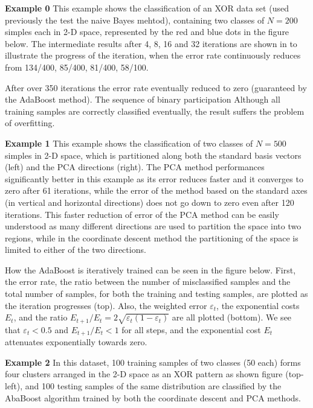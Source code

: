 \documentclass{article}
\begin{document}
{\bf Example 0} This example shows the classification of an XOR data
set (used previously the test the naive Bayes mehtod), containing two 
classes of $N=200$ simples each in 2-D space, represented by the red 
and blue dots in the figure below. The intermediate results after 4, 8,
16 and 32 iterations are shown in to illustrate the progress of the 
iteration, when the error rate continuously reduces from 134/400, 85/400, 
81/400, 58/100. 


After over 350 iterations the error rate eventually reduced to zero
(guaranteed by the AdaBoost method). The sequence of binary participation
Although all training samples are correctly classified eventually, the 
result suffers the problem of overfitting.


{\bf Example 1} This example shows the classification of two classes 
of $N=500$ simples in 2-D space, which is partitioned along both the
standard basis vectors (left) and the PCA directions (right). The PCA 
method performances significantly better in this example as its error 
reduces faster and it converges to zero after 61 iterations, while the 
error of the method based on the standard axes (in vertical and horizontal
directions) does not go down to zero even after 120 iterations. This 
faster reduction of error of the PCA method can be easily understood 
as many different directions are used to partition the space into two
regions, while in the coordinate descent method the partitioning of the 
space is limited to either of the two directions.


How the AdaBoost is iteratively trained can be seen in the figure below. 
First, the error rate, the ratio between the number of misclassified 
samples and the total number of samples, for both the training and 
testing samples, are plotted as the iteration progresses (top). Also, 
the weighted error $\varepsilon_t$, the exponential costs $E_t$, and
the ratio $E_{t+1}/E_t=2\sqrt{\varepsilon_t(1-\varepsilon_t)}$ are all
plotted (bottom). We see that $\varepsilon_t<0.5$ and $E_{t+1}/E_t<1$ 
for all steps, and the exponential cost $E_t$ attenuates exponentially
towards zero.



{\bf Example 2} In this dataset, 100 training samples of two classes 
(50 each) forms four clusters arranged in the 2-D space as an XOR pattern
as shown figure (top-left), and 100 testing samples of the same distribution
are classified by the AbaBoost algorithm trained by both the coordinate 
descent and PCA methods.
\end{document}
